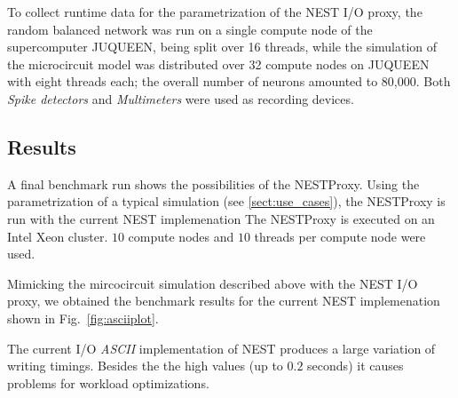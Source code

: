 \documentclass[]{YIC2015}
\begin{document}
To collect runtime data for the parametrization of the NEST I/O proxy,
the random balanced network was run on a single compute
node of the supercomputer JUQUEEN, being split over 16 threads, while
the simulation of the microcircuit model was distributed over 32
compute nodes on JUQUEEN with eight threads each; the overall number
of neurons amounted to 80,000. Both \emph{Spike detectors} and \emph{Multimeters}
were used as recording devices.

\subsection{Results}

A final benchmark run shows the possibilities of the NESTProxy.
Using the parametrization of a typical simulation (see \ref{sect:use_cases}),
the NESTProxy is run with the current NEST implemenation 
The NESTProxy is executed on an Intel Xeon cluster. $10$ compute nodes and $10$ threads per compute node were used. 

Mimicking the mircocircuit simulation described above with the NEST I/O proxy, we obtained
the benchmark results for the current NEST implemenation shown in Fig.~\ref{fig:asciiplot}.

The current I/O \emph{ASCII} implementation of NEST produces a large variation of writing timings.
Besides the the high values (up to $0.2$ seconds) it causes problems for workload optimizations.

\end{document}
